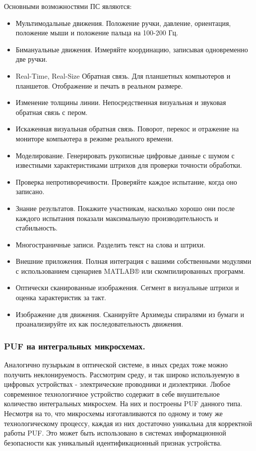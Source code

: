 Основными возможностями ПС являются:
\begin{itemize}
	\item Мультимодальные движения. Положение ручки, давление, ориентация, положение мыши и положение пальца на 100-200 Гц.
	\item Бимануальные движения. Измеряйте координацию, записывая одновременно две ручки.
	\item Real-Time, Real-Size Обратная связь. Для планшетных компьютеров и планшетов. Отображение и печать в реальном размере.
	\item Изменение толщины линии. Непосредственная визуальная и звуковая обратная связь с пером.
	\item Искаженная визуальная обратная связь. Поворот, перекос и отражение на мониторе компьютера в режиме реального времени.
	\item Моделирование. Генерировать рукописные цифровые данные с шумом с известными характеристиками штрихов для проверки точности обработки.
	\item Проверка непротиворечивости. Проверяйте каждое испытание, когда оно записано.
	\item Знание результатов. Покажите участникам, насколько хорошо они после каждого испытания показали максимальную производительность и стабильность.
	\item Многостраничные записи. Разделить текст на слова и штрихи.
	\item Внешние приложения. Полная интеграция с вашими собственными модулями с использованием сценариев MATLAB® или скомпилированных программ.
	\item Оптически сканированные изображения. Сегмент в визуальные штрихи и оценка характеристик за такт.
	\item Изображение для движения. Сканируйте Архимеды спиралями из бумаги и проанализируйте их как последовательность движения.
\end{itemize}


\subsubsection{PUF на интегральных микросхемах. }
\label{sub:domain:puf_physical_types:ic}

Аналогично пузырькам в оптической системе, в иных средах тоже можно получить неклонируемость. Рассмотрим среду, и так широко используемую в цифровых устройствах - электрические проводники и диэлектрики.
Любое современное технологичное устройство содержит в себе внушительное количество интегральных микросхем. На них и построены PUF данного типа. Несмотря на то, что микросхемы изготавливаются по одному и тому же технологическому процессу, каждая из них достаточно уникальна для корректной работы PUF. Это может быть использовано в системах информационной безопасности как уникальный идентификационный признак устройства.

